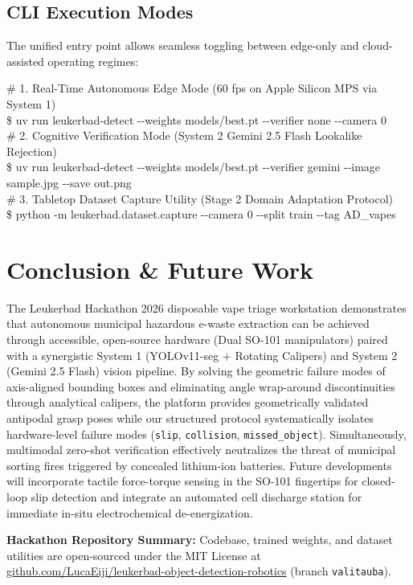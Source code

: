 \documentclass[10pt,a4paper]{article}
\begin{document}
\subsection{CLI Execution Modes}
The unified entry point allows seamless toggling between edge-only and cloud-assisted operating regimes:

\begin{tcolorbox}[colback=darkslate!4, colframe=darkslate!35, arc=1.2mm, boxrule=0.6pt, left=2.5mm, right=2.5mm, top=1.1mm, bottom=1.1mm]
\scriptsize\ttfamily
\# 1. Real-Time Autonomous Edge Mode (60 fps on Apple Silicon MPS via System 1)\\
\$ uv run leukerbad-detect -{}-weights models/best.pt -{}-verifier none -{}-camera 0\\[0.2em]
\# 2. Cognitive Verification Mode (System 2 Gemini 2.5 Flash Lookalike Rejection)\\
\$ uv run leukerbad-detect -{}-weights models/best.pt -{}-verifier gemini -{}-image sample.jpg -{}-save out.png\\[0.2em]
\# 3. Tabletop Dataset Capture Utility (Stage 2 Domain Adaptation Protocol)\\
\$ python -m leukerbad.dataset.capture -{}-camera 0 -{}-split train -{}-tag AD\_vapes
\end{tcolorbox}
\vspace{-0.25em}

\section{Conclusion \& Future Work}
The Leukerbad Hackathon 2026 disposable vape triage workstation demonstrates that autonomous municipal hazardous e-waste extraction can be achieved through accessible, open-source hardware (Dual SO-101 manipulators) paired with a synergistic System 1 (YOLOv11-seg + Rotating Calipers) and System 2 (Gemini 2.5 Flash) vision pipeline. By solving the geometric failure modes of axis-aligned bounding boxes and eliminating angle wrap-around discontinuities through analytical calipers, the platform provides geometrically validated antipodal grasp poses while our structured protocol systematically isolates hardware-level failure modes (\texttt{slip}, \texttt{collision}, \texttt{missed\_object}). Simultaneously, multimodal zero-shot verification effectively neutralizes the threat of municipal sorting fires triggered by concealed lithium-ion batteries. Future developments will incorporate tactile force-torque sensing in the SO-101 fingertips for closed-loop slip detection and integrate an automated cell discharge station for immediate in-situ electrochemical de-energization.

\vspace{0.2em}
\begin{tcolorbox}[colback=forestgreen!6, colframe=forestgreen!50, arc=1.2mm, boxrule=0.6pt, left=2.5mm, right=2.5mm, top=1.2mm, bottom=1.2mm]
\footnotesize\textbf{Hackathon Repository Summary:} Codebase, trained weights, and dataset utilities are open-sourced under the MIT License at \href{https://github.com/LucaEiji/leukerbad-object-detection-robotics}{github.com/LucaEiji/leukerbad-object-detection-robotics} (branch \texttt{valitauba}).
\end{tcolorbox}
\end{document}
